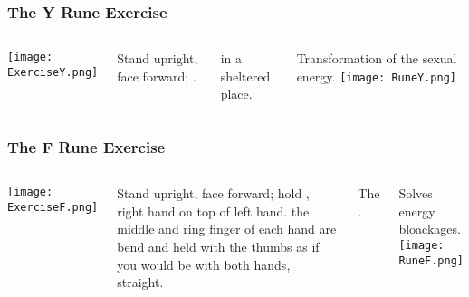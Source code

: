 \begin{frame}
\frametitle{The Y Rune Exercise}
\begin{columns}[c] %

\texttt{[image: ExerciseY.png]}

Stand upright, face forward; . 

\vspace{5mm}
 in a sheltered place.

\vspace{5mm}
Transformation of the sexual energy.
\texttt{[image: RuneY.png]}
\end{columns}

\end{frame}



\begin{frame}
\frametitle{The F Rune Exercise}
\begin{columns}[c] %

\texttt{[image: ExerciseF.png]}

Stand upright, face forward; hold , right hand on top of left hand. the middle and ring finger of each hand are bend and held with the thumbs as if you would be  with both hands,  straight.

The .

\vspace{5mm}
Solves energy bloackages.
\texttt{[image: RuneF.png]}
\end{columns}

\end{frame}



